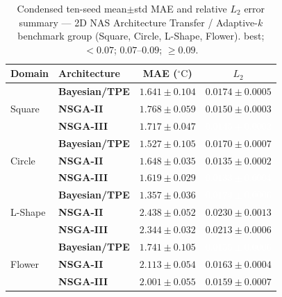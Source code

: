 \begin{table}[H]
\centering\small\setlength{\tabcolsep}{4pt}
\caption{Condensed ten-seed mean$\pm$std MAE and relative $L_2$ error summary --- 2D NAS Architecture Transfer / Adaptive-$k$ benchmark group (Square, Circle, L-Shape, Flower).
\phantom{x} best; \phantom{x} ${<}0.07$; \phantom{x} $0.07$--$0.09$; \phantom{x} ${\geq}0.09$.}
\label{tab:l2_summary_2d_adaptive}
\begin{tabular}{@{}llcc@{}}
\toprule
Domain & Architecture & MAE ($^\circ\mathrm{C}$) & $L_2$ \\
\midrule
\multirow{3}{*}{Square}
  & \textbf{Bayesian/TPE} & $1.641\pm0.104$ & \cellcolor{ForestGreen!25}$0.0174\pm0.0005$ \\
  & \textbf{NSGA-II} & $1.768\pm0.059$ & \cellcolor{ForestGreen!25}$0.0150\pm0.0003$ \\
  & \textbf{NSGA-III} & $1.717\pm0.047$ & \cellcolor{ForestGreen!55}\textcolor{white}{\textbf{$0.0145\pm0.0002$}} \\
\midrule
\multirow{3}{*}{Circle}
  & \textbf{Bayesian/TPE} & $1.527\pm0.105$ & \cellcolor{ForestGreen!25}$0.0170\pm0.0007$ \\
  & \textbf{NSGA-II} & $1.648\pm0.035$ & \cellcolor{ForestGreen!25}$0.0135\pm0.0002$ \\
  & \textbf{NSGA-III} & $1.619\pm0.029$ & \cellcolor{ForestGreen!55}\textcolor{white}{\textbf{$0.0133\pm0.0004$}} \\
\midrule
\multirow{3}{*}{L-Shape}
  & \textbf{Bayesian/TPE} & $1.357\pm0.036$ & \cellcolor{ForestGreen!55}\textcolor{white}{\textbf{$0.0174\pm0.0006$}} \\
  & \textbf{NSGA-II} & $2.438\pm0.052$ & \cellcolor{ForestGreen!25}$0.0230\pm0.0013$ \\
  & \textbf{NSGA-III} & $2.344\pm0.032$ & \cellcolor{ForestGreen!25}$0.0213\pm0.0006$ \\
\midrule
\multirow{3}{*}{Flower}
  & \textbf{Bayesian/TPE} & $1.741\pm0.105$ & \cellcolor{ForestGreen!55}\textcolor{white}{\textbf{$0.0155\pm0.0006$}} \\
  & \textbf{NSGA-II} & $2.113\pm0.054$ & \cellcolor{ForestGreen!25}$0.0163\pm0.0004$ \\
  & \textbf{NSGA-III} & $2.001\pm0.055$ & \cellcolor{ForestGreen!25}$0.0159\pm0.0007$ \\
\bottomrule
\end{tabular}
\end{table}



